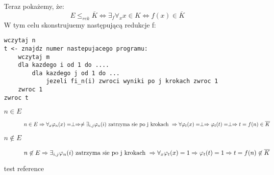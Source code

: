 \documentclass[svgnames]{report}
\begin{document}
Teraz pokażemy, że:
\begin{equation}
E \leqslant_{rek} \overline{K} \Leftrightarrow \exists_f \forall_{x} x \in K \Leftrightarrow f(x) \in \overline{K}
\end{equation}
W tym celu skonstrujuemy następującą redukcje f:
\begin{lstlisting}
wczytaj n
t <- znajdz numer nastepujacego programu:
	wczytaj m
	dla kazdego i od 1 do ....
		dla kazdego j od 1 do ...
			jezeli fi_n(i) zwroci wyniki po j krokach zwroc 1
	zwroc 1	
zwroc t
\end{lstlisting}
\begin{description}
	\item[$n \in E$]
		\begin{equation*}
			n \in E \Rightarrow \forall_x \varphi_n(x) = \perp \Rightarrow \neq \exists_{i,j} \varphi_n(i) \hbox{ zatrzyma sie po j krokach } \Rightarrow \forall \varphi_t(x) = \perp \Rightarrow \varphi_t(t) = \perp \Rightarrow t = f(n) \in \overline{K}
		\end{equation*}
	\item[$n \not\in E$]
		\begin{equation*}
			n \not\in E \Rightarrow \exists_{i,j} \varphi_n(i) \hbox{ zatrzyma sie po j krokach } \Rightarrow \forall_x \varphi_t(x) = 1 \Rightarrow \varphi_t(t) = 1 \Rightarrow t = f(n) \not\in \overline{K}
		\end{equation*}
\end{description}

\begin{thebibliography}{99}
 test reference
\end{thebibliography}
\end{document}
